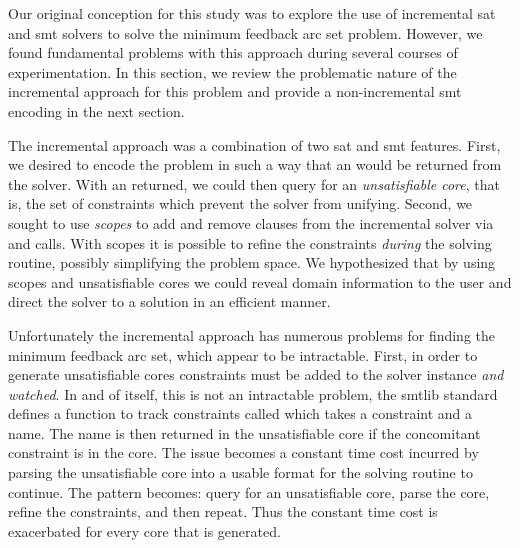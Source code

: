 \label{section:incremental}

Our original conception for this study was to explore the use of incremental
\ac{sat} and \ac{smt} solvers to solve the minimum feedback arc set problem.
However, we found fundamental problems with this approach during several courses
of experimentation. In this section, we review the problematic nature of the
incremental approach for this problem and provide a non-incremental \ac{smt}
encoding in the next section.

The incremental approach was a combination of two \ac{sat} and \ac{smt}
features. First, we desired to encode the problem in such a way that an
 would be returned from the solver. With an  returned, we
could then query for an \emph{unsatisfiable core}, that is, the set of
constraints which prevent the solver from unifying. Second, we sought to use
\emph{scopes} to add and remove clauses from the incremental solver via
 and  calls. With scopes it is possible to refine the
constraints \emph{during} the solving routine, possibly simplifying the problem
space. We hypothesized that by using scopes and unsatisfiable cores we could
reveal domain information to the user and direct the solver to a solution in an
efficient manner.

Unfortunately the incremental approach has numerous problems for finding the
minimum feedback arc set, which appear to be intractable. First, in order to
generate unsatisfiable cores constraints must be added to the solver instance
\emph{and watched}. In and of itself, this is not an intractable problem, the
\acl{smtlib} standard defines a function to track constraints called
 which takes a constraint and a name. The name is then
returned in the unsatisfiable core if the concomitant constraint is in the core.
The issue becomes a constant time cost incurred by parsing the unsatisfiable
core into a usable format for the solving routine to continue. The pattern
becomes: query for an unsatisfiable core, parse the core, refine the
constraints, and then repeat. Thus the constant time cost is exacerbated for
every core that is generated.

